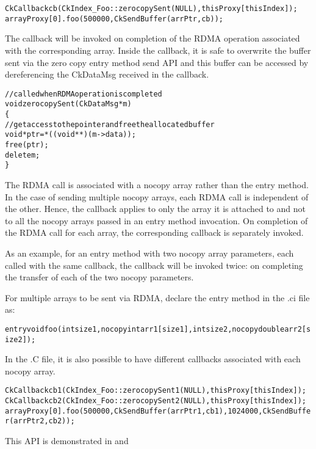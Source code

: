 \begin{alltt}
CkCallback cb(CkIndex_Foo::zerocopySent(NULL), thisProxy[thisIndex]);
arrayProxy[0].foo(500000, CkSendBuffer(arrPtr, cb));
\end{alltt}

The callback will be invoked on completion of the RDMA operation associated with the
corresponding array. Inside the callback, it is safe to overwrite the buffer sent
via the zero copy entry method send API and this buffer can be accessed by dereferencing
the CkDataMsg received in the callback.

\begin{alltt}
//called when RDMA operation is completed
void zerocopySent(CkDataMsg *m)
\{
  //get access to the pointer and free the allocated buffer
  void *ptr = *((void **)(m->data));
  free(ptr);
  delete m;
\}
\end{alltt}

The RDMA call is associated with a nocopy array rather than the entry method.
In the case of sending multiple nocopy arrays, each RDMA call is independent of the other.
Hence, the callback applies to only the array it is attached to and not to all the nocopy
arrays passed in an entry method invocation. On completion of the RDMA call for each
array, the corresponding callback is separately invoked.

As an example, for an entry method with two nocopy array parameters, each called with the same
callback, the callback will be invoked twice: on completing the transfer of each of the two
nocopy parameters.

\vspace{0.1in}
\noindent
For multiple arrays to be sent via RDMA, declare the entry method in the .ci file as:

\begin{alltt}
entry void foo (int size1, nocopy int arr1[size1], int size2, nocopy double arr2[size2]);
\end{alltt}

In the .C file, it is also possible to have different callbacks associated with each nocopy array.
\begin{alltt}
CkCallback cb1(CkIndex_Foo::zerocopySent1(NULL), thisProxy[thisIndex]);
CkCallback cb2(CkIndex_Foo::zerocopySent2(NULL), thisProxy[thisIndex]);
arrayProxy[0].foo(500000, CkSendBuffer(arrPtr1, cb1), 1024000, CkSendBuffer(arrPtr2, cb2));
\end{alltt}

This API is demonstrated in 
and 

